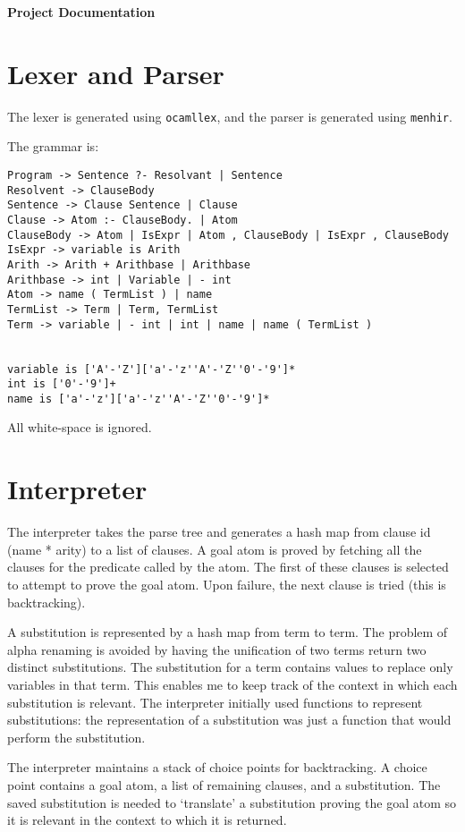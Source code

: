 \documentclass[12pt,a4paper,twoside]{article}
\begin{document}
\textbf{Project Documentation}

\section{Lexer and Parser}

The lexer is generated using \texttt{ocamllex}, and the parser is generated using \texttt{menhir}.

The grammar is:
\begin{verbatim}
Program -> Sentence ?- Resolvant | Sentence
Resolvent -> ClauseBody
Sentence -> Clause Sentence | Clause 
Clause -> Atom :- ClauseBody. | Atom
ClauseBody -> Atom | IsExpr | Atom , ClauseBody | IsExpr , ClauseBody
IsExpr -> variable is Arith
Arith -> Arith + Arithbase | Arithbase
Arithbase -> int | Variable | - int 
Atom -> name ( TermList ) | name 
TermList -> Term | Term, TermList 
Term -> variable | - int | int | name | name ( TermList )


variable is ['A'-'Z']['a'-'z''A'-'Z''0'-'9']*
int is ['0'-'9']+
name is ['a'-'z']['a'-'z''A'-'Z''0'-'9']*
\end{verbatim}

All white-space is ignored.

\section{Interpreter}

The interpreter takes the parse tree and generates a hash map from clause id (name * arity) to a list of clauses. A goal atom is proved by fetching all the clauses for the predicate called by the atom. The first of these clauses is selected to attempt to prove the goal atom. Upon failure, the next clause is tried (this is backtracking). 

A substitution is represented by a hash map from term to term.  The problem of alpha renaming is avoided by having the unification of two terms return two distinct substitutions. The substitution for a term contains values to replace only variables in that term. This enables me to keep track of the context in which each substitution is relevant. 
The interpreter initially used functions to represent substitutions: the representation of a substitution was just a function that would perform the substitution.  

The interpreter maintains a stack of choice points for backtracking. A choice point contains a goal atom, a list of remaining clauses, and a substitution. The saved substitution is needed to `translate' a substitution proving the goal atom so it is relevant in the context to which it is returned.
\end{document}
